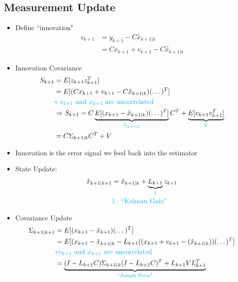 \documentclass[11pt]{article}
\begin{document}
\subsection{Measurement Update}
\begin{itemize}
    \item Define ``innovation"
    \begin{align*}
        z_{k+1} &= y_{k+1} - C\hat{x}_{k+1|k} 
        \\
        &= Cx_{k+1} + v_{k+1} - C\hat{x}_{k+1|k}
    \end{align*}
    \item Innovation Covariance 
    \begin{align*}
        S_{k+1} &= E[z_{k+1}z^T_{k+1}]
        \\
        &= E[(Cx_{k+1} + v_{k+1} - C\hat{x}_{k+1|k})(\dots)^T] 
        \\
       & \textcolor{cyan}{*\text{ }v_{k+1}\text{ and } x_{k+1}\text{ are uncorrelated}}
       \\
       & \Rightarrow S_{k+1} = C\underbrace{E[(x_{k+1}-\hat{x}_{k+1|k})(\dots)^T]}_{\textcolor{cyan}{\Sigma_{k+1|k}}}C^T + \underbrace{E[v_{k+1}v_{k+1}^T]}_{\textcolor{cyan}{V}}
       \\
       &= C\Sigma_{k+1|k}C^T + V
       \end{align*}
       \item Innovation is the error signal we feed back into the estimator
       \item State Update:
       \begin{align*}
           \hat{x}_{k+1|k+1} &= \hat{x}_{k+1|k} + \underbrace{L_{k+1}}_{\textcolor{cyan}{1}}z_{k+1}
           \\
           &\textcolor{cyan}{1: \text{``Kalman Gain"}}
       \end{align*}
       \item Covariance Update
        \begin{align*}
            \Sigma_{k+1|k+1} &= E[(x_{k+1}-\hat{x}_{k+1})(\dots)^T]
            \\
            &= E[(x_{k+1}-\hat{x}_{k+1|k}-L_{k+1}((x_{k+1}+ v_{k+1} - (\hat{x}_{k+1|k}))(\dots)^T]
            \\
            &\textcolor{cyan}{* v_{k+1} \text{ and } x_{k+1} \text{ are uncorrelated}}
            \\
            &= \underbrace{(I-L_{k+1}C)\Sigma_{k+1|k}(I-L_{k+1}C)^T + L_{k+1}VL_{k+1}^T}_{\textcolor{cyan}{\text{``Joseph Form"}}}
        \end{align*}

\end{itemize}
\end{document}
